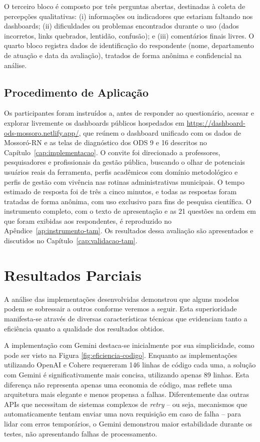 O terceiro bloco é composto por três perguntas abertas, destinadas à coleta de percepções qualitativas: (i) informações ou indicadores que estariam faltando nos dashboards; (ii) dificuldades ou problemas encontrados durante o uso (dados incorretos, links quebrados, lentidão, confusão); e (iii) comentários finais livres. O quarto bloco registra dados de identificação do respondente (nome, departamento de atuação e data da avaliação), tratados de forma anônima e confidencial na análise.

\subsection{Procedimento de Aplicação}
\label{subsec:procedimento-tam}

Os participantes foram instruídos a, antes de responder ao questionário, acessar e explorar livremente os dashboards públicos hospedados em \url{https://dashboard-ods-mossoro.netlify.app/}, que reúnem o dashboard unificado com os dados de Mossoró-RN e as telas de diagnóstico dos ODS 9 e 16 descritos no Capítulo~\ref{cap:implementacao}. O convite foi direcionado a professores, pesquisadores e profissionais da gestão pública, buscando o olhar de potenciais usuários reais da ferramenta, perfis acadêmicos com domínio metodológico e perfis de gestão com vivência nas rotinas administrativas municipais. O tempo estimado de resposta foi de três a cinco minutos, e todas as respostas foram tratadas de forma anônima, com uso exclusivo para fins de pesquisa científica. O instrumento completo, com o texto de apresentação e as 21 questões na ordem em que foram exibidas aos respondentes, é reproduzido no Apêndice~\ref{ap:instrumento-tam}. Os resultados dessa avaliação são apresentados e discutidos no Capítulo~\ref{cap:validacao-tam}.

\section{Resultados Parciais}
\label{sec:resultados-parciais}

A análise das implementações desenvolvidas demonstrou que alguns modelos podem se sobressair a outros conforme veremos a seguir. Esta superioridade
manifesta-se através de diversas características técnicas que evidenciam tanto a eficiência quanto a
qualidade dos resultados obtidos.

A implementação com Gemini destaca-se inicialmente por sua simplicidade, como pode ser
visto na Figura \ref{fig:eficiencia-codigo}. Enquanto as implementações utilizando OpenAI e Cohere
requereram 146 linhas de código cada uma, a solução com Gemini é significativamente mais
concisa, utilizando apenas 89 linhas. Esta diferença não representa apenas uma economia de código,
mas reflete uma arquitetura mais elegante e menos propensa a falhas. Diferentemente das outras
APIs que necessitam de sistemas complexos de \textit{retry} -- ou seja, mecanismos que automaticamente
tentam enviar uma nova requisição em caso de falha -- para lidar com erros temporários, o Gemini
demonstrou maior estabilidade durante os testes, não apresentando falhas de processamento.

